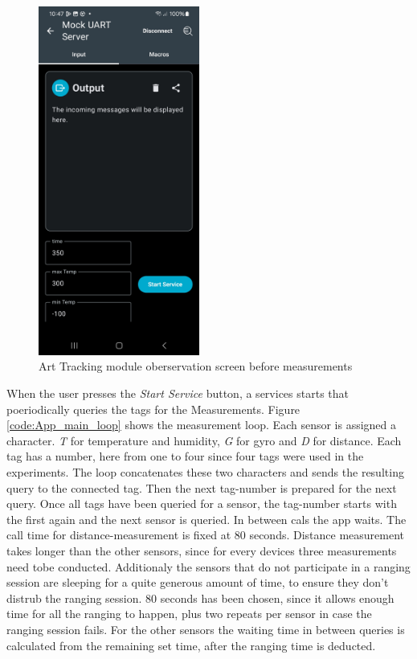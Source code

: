 \begin{figure}[ht!]
\centering
\includegraphics[width=200px]{graphics/nRF_toolbox_art_tracking_empty.jpg}
\caption{Art Tracking module oberservation screen before measurements}
\label{f:Toolbox_art_tracking_empty}
\end{figure}


When the user presses the \textit{Start Service} button, a services starts that poeriodically queries the tags for the Measurements.
Figure \ref{code:App_main_loop} shows the measurement loop.
Each sensor is assigned a character.
\textit{T} for temperature and humidity, \textit{G} for gyro and \textit{D} for distance.
Each tag has a number, here from one to four since four tags were used in the experiments.
The loop concatenates these two characters and sends the resulting query to the connected tag.
Then the next tag-number is prepared for the next query.
Once all tags have been queried for a sensor, the tag-number starts with the first again and the next sensor is queried.
In between cals the app waits.
The call time for distance-measurement is fixed at 80 seconds.
Distance measurement takes longer than the other sensors, since for every devices three measurements need tobe conducted.
Additionaly the sensors that do not participate in a ranging session are sleeping for a quite generous amount of time, to ensure they don't distrub the ranging session.
80 seconds has been chosen, since it allows enough time for all the ranging to happen, plus two repeats per sensor in case the ranging session fails.
For the other sensors the waiting time in between queries is calculated from the remaining set time, after the ranging time is deducted.

